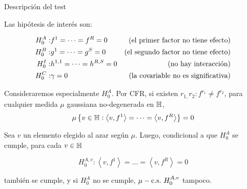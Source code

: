 \documentclass[10pt,spanish,handout]{beamer}\usepackage[]{graphicx}\usepackage[]{color}
\begin{document}
%
\begin{frame}{Descripción del test}

Las hipótesis de interés son:

\vspace{-15pt}

\begin{alignat*}{2}
H_{0}^{A}: & f^{1}=\dots=f^{R}=0 & \textnormal{(el primer factor no tiene efecto)}\\
H_{0}^{B}: & g^{1}=\dots=g^{S}=0 & \textnormal{(el segundo factor no tiene efecto)}\\
H_{0}^{I}: & h^{1,1}=\dots=h^{R,S}=0 & \textnormal{(no hay interacción)}\\
H_{0}^{C}: & \gamma=0 & \textnormal{(la covariable no es significativa)}
\end{alignat*}


\pause{}

Consideraremos especialmente $H_{0}^{A}.$ Por CFR, si existen $r_{1,}r_{2}:f^{r_{1}}\neq f^{r_{2}}$,
para cualquier medida $\mu$ gaussiana no-degenerada en $\mathbb{H}$,
\[
\mu\left\{ v\in\mathbb{H}:\left\langle v,f^{1}\right\rangle =\dots=\left\langle v,f^{R}\right\rangle \right\} =0
\]


\pause{}

Sea $v$ un elemento elegido al azar según $\mu$. Luego, condicional
a que $H_{0}^{A}$ se cumple, para cada $v\in\mathbb{H}$

\vspace{-15pt}

\[
H_{0}^{A,v}:\left\langle v,f^{1}\right\rangle =\dots=\left\langle v,f^{R}\right\rangle =0
\]

también se cumple, y si $H_{0}^{A}$ no se cumple, $\mu-\textnormal{c.s.}\ H_{0}^{A,v}$
tampoco.
\end{frame}
\end{document}

